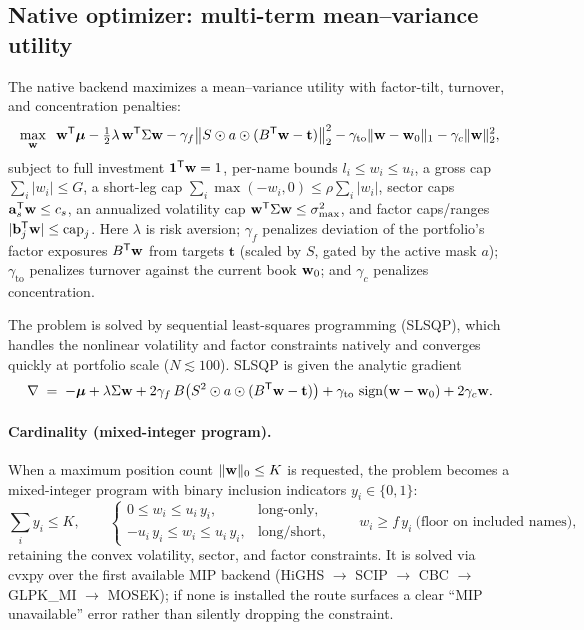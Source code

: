 \documentclass[11pt]{article}
\begin{document}
\subsection{Native optimizer: multi-term mean--variance utility}
The native backend maximizes a mean--variance utility with factor-tilt,
turnover, and concentration penalties:
\begin{equation}
  \max_{\mathbf{w}}\;\;
  \mathbf{w}^{\mathsf{T}}\boldsymbol{\mu}
  -\tfrac12\lambda\,\mathbf{w}^{\mathsf{T}}\Sigma\mathbf{w}
  -\gamma_f\big\lVert S\odot a\odot(B^{\mathsf{T}}\mathbf{w}-\mathbf t)\big\rVert_2^2
  -\gamma_{\text{to}}\lVert\mathbf{w}-\mathbf{w}_0\rVert_1
  -\gamma_c\lVert\mathbf{w}\rVert_2^2,
\end{equation}
subject to full investment $\mathbf{1}^{\mathsf{T}}\mathbf{w}=1$, per-name bounds $l_i\le w_i\le u_i$,
a gross cap $\sum_i|w_i|\le G$, a short-leg cap $\sum_i\max(-w_i,0)\le \rho\sum_i|w_i|$,
sector caps $\mathbf a_s^{\mathsf{T}}\mathbf{w}\le c_s$, an annualized volatility cap
$\mathbf{w}^{\mathsf{T}}\Sigma\mathbf{w}\le\sigma_{\max}^2$, and factor caps/ranges
$|\mathbf b_j^{\mathsf{T}}\mathbf{w}|\le\text{cap}_j$. Here $\lambda$ is risk aversion; $\gamma_f$
penalizes deviation of the portfolio's factor exposures $B^{\mathsf{T}}\mathbf{w}$ from targets
$\mathbf t$ (scaled by $S$, gated by the active mask $a$); $\gamma_{\text{to}}$
penalizes turnover against the current book $\mathbf{w}_0$; and $\gamma_c$ penalizes
concentration.

The problem is solved by sequential least-squares programming (SLSQP), which
handles the nonlinear volatility and factor constraints natively and converges
quickly at portfolio scale ($N\lesssim100$). SLSQP is given the analytic
gradient
\begin{equation}
  \nabla \;=\; -\boldsymbol{\mu}+\lambda\Sigma\mathbf{w}
  +2\gamma_f\,B\big(S^2\odot a\odot(B^{\mathsf{T}}\mathbf{w}-\mathbf t)\big)
  +\gamma_{\text{to}}\,\operatorname{sign}(\mathbf{w}-\mathbf{w}_0)+2\gamma_c\mathbf{w} .
\end{equation}

\paragraph{Cardinality (mixed-integer program).} When a maximum position count
$\lVert\mathbf{w}\rVert_0\le K$ is requested, the problem becomes a mixed-integer program
with binary inclusion indicators $y_i\in\{0,1\}$:
\begin{equation}
  \sum_i y_i\le K,\qquad
  \begin{cases}
    0\le w_i\le u_i\,y_i, & \text{long-only,}\\[2pt]
    -u_i\,y_i\le w_i\le u_i\,y_i, & \text{long/short,}
  \end{cases}
  \qquad w_i\ge f\,y_i\ \text{(floor on included names),}
\end{equation}
retaining the convex volatility, sector, and factor constraints. It is solved via
cvxpy over the first available MIP backend (HiGHS $\to$ SCIP $\to$ CBC $\to$
GLPK\_MI $\to$ MOSEK); if none is installed the route surfaces a clear
``MIP unavailable'' error rather than silently dropping the constraint.
\end{document}
